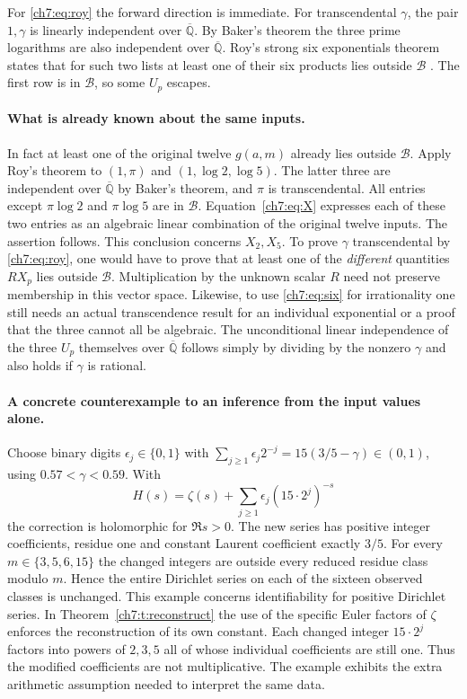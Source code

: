 \documentclass[11pt,a4paper,oneside,openany]{report}
\theoremstyle{remark}\newtheorem{remark}[theorem]{Remark}
\numberwithin{equation}{section}
\newcommand{\A}{\overline{\mathbb Q}}\newcommand{\B}{\mathcal B}
\begin{document}
For \eqref{ch7:eq:roy} the forward direction is immediate. For transcendental $\gamma$, the pair $1,\gamma$ is linearly independent over $\A$. By Baker's theorem the three prime logarithms are also independent over $\A$. Roy's strong six exponentials theorem states that for such two lists at least one of their six products lies outside $\B$ \cite{roy}. The first row is in $\B$, so some $U_p$ escapes.

\paragraph{What is already known about the same inputs.}
In fact at least one of the original twelve $g(a,m)$ already lies outside $\B$. Apply Roy's theorem to $(1,\pi)$ and $(1,\log2,\log5)$. The latter three are independent over $\A$ by Baker's theorem, and $\pi$ is transcendental. All entries except $\pi\log2$ and $\pi\log5$ are in $\B$. Equation~\eqref{ch7:eq:X} expresses each of these two entries as an algebraic linear combination of the original twelve inputs. The assertion follows. This conclusion concerns $X_2,X_5$. To prove $\gamma$ transcendental by \eqref{ch7:eq:roy}, one would have to prove that at least one of the \emph{different} quantities $R X_p$ lies outside $\B$. Multiplication by the unknown scalar $R$ need not preserve membership in this vector space. Likewise, to use \eqref{ch7:eq:six} for irrationality one still needs an actual transcendence result for an individual exponential or a proof that the three cannot all be algebraic. The unconditional linear independence of the three $U_p$ themselves over $\A$ follows simply by dividing by the nonzero $\gamma$ and also holds if $\gamma$ is rational.

\paragraph{A concrete counterexample to an inference from the input values alone.}
Choose binary digits $\epsilon_j\in\{0,1\}$ with $\sum_{j\ge1}\epsilon_j2^{-j}=15(3/5-\gamma)\in(0,1)$, using $0.57<\gamma<0.59$. With
\[
    H(s)=\zeta(s)+\sum_{j\ge1}\epsilon_j(15\cdot2^j)^{-s}
\]
the correction is holomorphic for $\Re s>0$. The new series has positive integer coefficients, residue one and constant Laurent coefficient exactly $3/5$. For every $m\in\{3,5,6,15\}$ the changed integers are outside every reduced residue class modulo $m$. Hence the entire Dirichlet series on each of the sixteen observed classes is unchanged. This example concerns identifiability for positive Dirichlet series. In Theorem~\ref{ch7:t:reconstruct} the use of the specific Euler factors of $\zeta$ enforces the reconstruction of its own constant. Each changed integer $15\cdot2^j$ factors into powers of $2,3,5$ all of whose individual coefficients are still one. Thus the modified coefficients are not multiplicative. The example exhibits the extra arithmetic assumption needed to interpret the same data.
\end{document}
